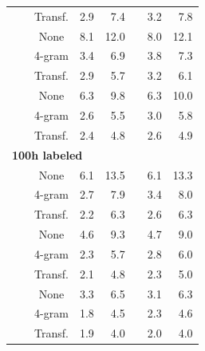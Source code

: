 \documentclass{article}
\begin{document}
\begin{table}[h]
\begin{tabular}{lcccrrrr}
&& Transf. & 2.9 & 7.4 && 3.2 & 7.8 \\
\wvppbig{} & \librisz{} & None & 8.1 & 12.0 && 8.0 & 12.1 \\
&& 4-gram & 3.4 & 6.9 && 3.8 & 7.3 \\
&& Transf. & 2.9 & 5.7 && 3.2 & 6.1 \\
\wvppbig{} & \voxsz{} & None & 6.3 & 9.8 && 6.3 & 10.0 \\
&& 4-gram & 2.6 & 5.5 && 3.0 & 5.8 \\
&& Transf. & 2.4 & 4.8 && 2.6 & 4.9 \\
\midrule
\midrule
\multicolumn{8}{l}{\textbf{100h labeled}}\\
\wvppbase{} & \librisz{} & None & 6.1 & 13.5 && 6.1 & 13.3 \\
&& 4-gram & 2.7 & 7.9 && 3.4 & 8.0 \\
&& Transf. & 2.2 & 6.3 && 2.6 & 6.3 \\
\wvppbig{} & \librisz{} & None & 4.6 & 9.3 && 4.7 & 9.0 \\
&& 4-gram & 2.3 & 5.7 && 2.8 & 6.0 \\
&& Transf. & 2.1 & 4.8 && 2.3 & 5.0 \\
\wvppbig{} & \voxsz{} & None & 3.3 & 6.5 && 3.1 & 6.3 \\
&& 4-gram & 1.8 & 4.5 && 2.3 & 4.6 \\
&& Transf. & 1.9 & 4.0 && 2.0 & 4.0 \\
\bottomrule
\end{tabular}
\end{table}
\end{document}
